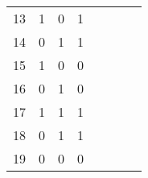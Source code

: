 \begin{table}[htbp]
\begin{tabular}{|c|c|c|c|cccc}
		\cline{1-4}    13    & 1     & 0     & 1     &       &       &       &  \bigstrut\\
		\cline{1-4}    14    & 0     & 1     & 1     &       &       &       &  \bigstrut\\
		\cline{1-4}    15    & 1     & 0     & 0     &       &       &       &  \bigstrut\\
		\cline{1-4}    16    & 0     & 1     & 0     &       &       &       &  \bigstrut\\
		\cline{1-4}    17    & 1     & 1     & 1     &       &       &       &  \bigstrut\\
		\cline{1-4}    18    & 0     & 1     & 1     &       &       &       &  \bigstrut\\
		\cline{1-4}    19    & 0     & 0     & 0     &       &       &       &  \bigstrut\\
		\cline{1-4}    \end{tabular}%
	\label{tab:addlabel}%
\end{table}%

